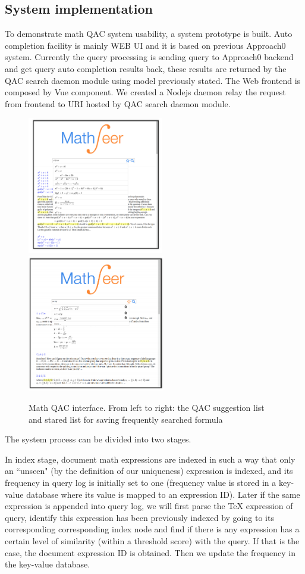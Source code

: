 \documentclass[12pt]{article} %
\begin{document}
\subsection{System implementation}
To demonstrate math QAC system usability, a system prototype is built.
Auto completion facility is mainly WEB UI and it is based on previous Approach0 system.
Currently the query processing is sending query to Approach0 backend and get
query auto completion results back, these results are returned by the QAC search daemon module
using model previously stated.
The Web frontend is composed by Vue component.
We created a Nodejs daemon relay the request from frontend to URI hosted by QAC search daemon module. 
\begin{figure}
\begin{center}
\includegraphics[height=6cm]{qac-system-suggest}
\includegraphics[height=6cm]{qac-system-star}
\caption{Math QAC interface. From left to right: the QAC suggestion list and stared list for saving frequently searched formula}
\end{center}
\end{figure}

The system process can be divided into two stages.

In index stage, document math expressions are
indexed in such a way that only an “unseen" (by the definition of our uniqueness) expression is
indexed, and its frequency in query log is initially set to one (frequency value is stored in a key-value database where its value is mapped to an expression ID).
Later
if the same expression is appended into query log, we will first parse the TeX expression of query, identify this expression has been previously indexed by going to its corresponding corresponding index node and find if there is any expression has a certain level of similarity (within a threshold score) with the query. If that is the case, the document expression ID is obtained.
Then we update the frequency in the key-value database.
\end{document}
